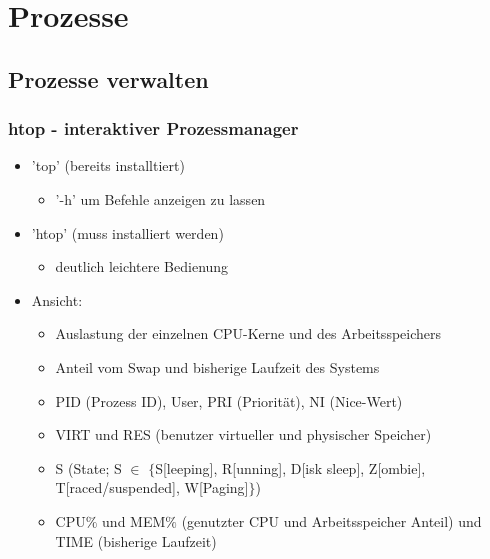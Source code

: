 \documentclass[12pt,utf8, handout]{beamer}
\begin{document}
\section{Prozesse}
\subsection{Prozesse verwalten}
\begin{frame}
\frametitle{htop - interaktiver Prozessmanager}
\begin{itemize}
	\item 'top' (bereits installtiert)
	\begin{itemize}[<+->]
		\item {\scriptsize '-h' um Befehle anzeigen zu lassen}
	\end{itemize}
	\item 'htop' (muss installiert werden)
	\begin{itemize}[<+->]
		\item {\scriptsize deutlich leichtere Bedienung}
	\end{itemize}
	\item Ansicht:
	\begin{itemize}[<+->]
		\item {\scriptsize Auslastung der einzelnen CPU-Kerne und des Arbeitsspeichers}
		\item {\scriptsize Anteil vom Swap und bisherige Laufzeit des Systems}
		\item {\scriptsize PID (Prozess ID), User, PRI (Priorität), NI (Nice-Wert)}
		\item {\scriptsize VIRT und RES (benutzer virtueller und physischer Speicher)}
		\item {\scriptsize S (State; S $\in$ $\{${\footnotesize S[leeping], R[unning], D[isk sleep], Z[ombie], T[raced/suspended], W[Paging]}$\}$)}
		\item {\scriptsize CPU$\%$ und MEM$\%$ (genutzter CPU und Arbeitsspeicher Anteil) und TIME (bisherige Laufzeit)}
	\end{itemize}
\end{itemize}
\end{frame}
\end{document}
